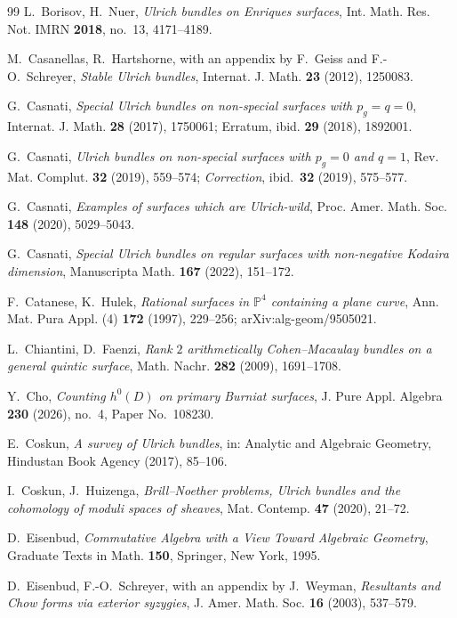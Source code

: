 \documentclass{amsart}
\theoremstyle{definition}
\newcommand{\PP}{\mathbb{P}}
\begin{document}
\begin{thebibliography}{99}
L.~Borisov, H.~Nuer,
\emph{Ulrich bundles on Enriques surfaces},
Int. Math. Res. Not. IMRN \textbf{2018}, no.~13, 4171--4189.

M.~Casanellas, R.~Hartshorne, with an appendix by F.~Geiss and F.-O.~Schreyer,
\emph{Stable Ulrich bundles},
Internat. J. Math. \textbf{23} (2012), 1250083.

G.~Casnati,
\emph{Special Ulrich bundles on non-special surfaces with $p_g=q=0$},
Internat. J. Math. \textbf{28} (2017), 1750061; Erratum, ibid. \textbf{29} (2018), 1892001.

G.~Casnati,
\emph{Ulrich bundles on non-special surfaces with $p_g=0$ and $q=1$},
Rev. Mat. Complut. \textbf{32} (2019), 559--574;
\emph{Correction}, ibid.\ \textbf{32} (2019), 575--577.

G.~Casnati,
\emph{Examples of surfaces which are Ulrich-wild},
Proc. Amer. Math. Soc. \textbf{148} (2020), 5029--5043.

G.~Casnati,
\emph{Special Ulrich bundles on regular surfaces with non-negative Kodaira dimension},
Manuscripta Math. \textbf{167} (2022), 151--172.

F.~Catanese, K.~Hulek,
\emph{Rational surfaces in $\PP^4$ containing a plane curve},
Ann. Mat. Pura Appl. (4) \textbf{172} (1997), 229--256; arXiv:alg-geom/9505021.

L.~Chiantini, D.~Faenzi,
\emph{Rank $2$ arithmetically Cohen--Macaulay bundles on a general quintic surface},
Math. Nachr. \textbf{282} (2009), 1691--1708.

Y.~Cho,
\emph{Counting $h^0(D)$ on primary Burniat surfaces},
J. Pure Appl. Algebra \textbf{230} (2026), no.~4, Paper No.\ 108230.

E.~Coskun,
\emph{A survey of Ulrich bundles},
in: Analytic and Algebraic Geometry, Hindustan Book Agency (2017), 85--106.

I.~Coskun, J.~Huizenga,
\emph{Brill--Noether problems, Ulrich bundles and the cohomology of moduli spaces of sheaves},
Mat. Contemp. \textbf{47} (2020), 21--72.

D.~Eisenbud,
\emph{Commutative Algebra with a View Toward Algebraic Geometry},
Graduate Texts in Math. \textbf{150}, Springer, New York, 1995.

D.~Eisenbud, F.-O.~Schreyer, with an appendix by J.~Weyman,
\emph{Resultants and Chow forms via exterior syzygies},
J. Amer. Math. Soc. \textbf{16} (2003), 537--579.


\end{thebibliography}
\end{document}
